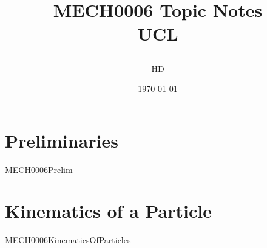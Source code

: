 \documentclass[12pt,a4paper, twoside]{report}
\begin{document}
\title{
  {MECH0006 Topic Notes}\\
  {\large UCL}
  \author{HD}
  \date{\today}
}
\maketitle

\tableofcontents
\chapter{Preliminaries}
{MECH0006Prelim}

\chapter{Kinematics of a Particle}
{MECH0006KinematicsOfParticles}
\end{document}
